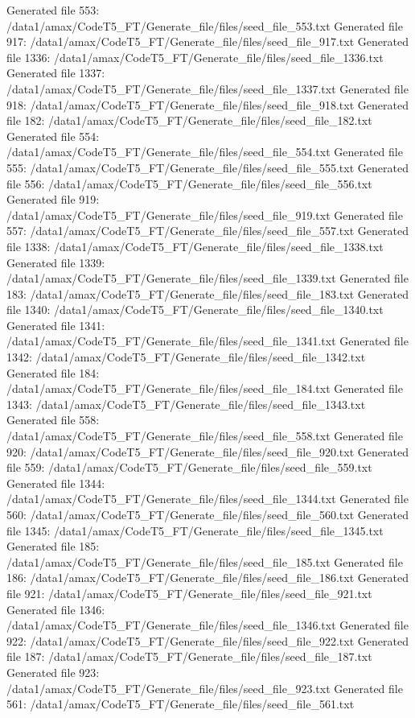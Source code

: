 Generated file 553: /data1/amax/CodeT5_FT/Generate_file/files/seed_file_553.txt
Generated file 917: /data1/amax/CodeT5_FT/Generate_file/files/seed_file_917.txt
Generated file 1336: /data1/amax/CodeT5_FT/Generate_file/files/seed_file_1336.txt
Generated file 1337: /data1/amax/CodeT5_FT/Generate_file/files/seed_file_1337.txt
Generated file 918: /data1/amax/CodeT5_FT/Generate_file/files/seed_file_918.txt
Generated file 182: /data1/amax/CodeT5_FT/Generate_file/files/seed_file_182.txt
Generated file 554: /data1/amax/CodeT5_FT/Generate_file/files/seed_file_554.txt
Generated file 555: /data1/amax/CodeT5_FT/Generate_file/files/seed_file_555.txt
Generated file 556: /data1/amax/CodeT5_FT/Generate_file/files/seed_file_556.txt
Generated file 919: /data1/amax/CodeT5_FT/Generate_file/files/seed_file_919.txt
Generated file 557: /data1/amax/CodeT5_FT/Generate_file/files/seed_file_557.txt
Generated file 1338: /data1/amax/CodeT5_FT/Generate_file/files/seed_file_1338.txt
Generated file 1339: /data1/amax/CodeT5_FT/Generate_file/files/seed_file_1339.txt
Generated file 183: /data1/amax/CodeT5_FT/Generate_file/files/seed_file_183.txt
Generated file 1340: /data1/amax/CodeT5_FT/Generate_file/files/seed_file_1340.txt
Generated file 1341: /data1/amax/CodeT5_FT/Generate_file/files/seed_file_1341.txt
Generated file 1342: /data1/amax/CodeT5_FT/Generate_file/files/seed_file_1342.txt
Generated file 184: /data1/amax/CodeT5_FT/Generate_file/files/seed_file_184.txt
Generated file 1343: /data1/amax/CodeT5_FT/Generate_file/files/seed_file_1343.txt
Generated file 558: /data1/amax/CodeT5_FT/Generate_file/files/seed_file_558.txt
Generated file 920: /data1/amax/CodeT5_FT/Generate_file/files/seed_file_920.txt
Generated file 559: /data1/amax/CodeT5_FT/Generate_file/files/seed_file_559.txt
Generated file 1344: /data1/amax/CodeT5_FT/Generate_file/files/seed_file_1344.txt
Generated file 560: /data1/amax/CodeT5_FT/Generate_file/files/seed_file_560.txt
Generated file 1345: /data1/amax/CodeT5_FT/Generate_file/files/seed_file_1345.txt
Generated file 185: /data1/amax/CodeT5_FT/Generate_file/files/seed_file_185.txt
Generated file 186: /data1/amax/CodeT5_FT/Generate_file/files/seed_file_186.txt
Generated file 921: /data1/amax/CodeT5_FT/Generate_file/files/seed_file_921.txt
Generated file 1346: /data1/amax/CodeT5_FT/Generate_file/files/seed_file_1346.txt
Generated file 922: /data1/amax/CodeT5_FT/Generate_file/files/seed_file_922.txt
Generated file 187: /data1/amax/CodeT5_FT/Generate_file/files/seed_file_187.txt
Generated file 923: /data1/amax/CodeT5_FT/Generate_file/files/seed_file_923.txt
Generated file 561: /data1/amax/CodeT5_FT/Generate_file/files/seed_file_561.txt
